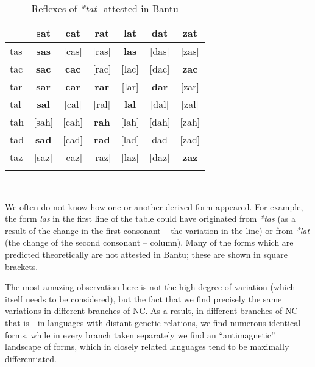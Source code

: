 \begin{table}
\caption{\label{tab:4:8}Reflexes of \textit{*tat-} attested in Bantu}


\begin{tabularx}{.66\textwidth}{lcccccc}
\lsptoprule
& \color{lsLightWine}sat &\color{lsLightWine} cat &\color{lsLightWine} rat &\color{lsLightWine} lat & \color{lsLightWine}dat & \color{lsLightWine}zat\\
\midrule
\color{lsLightWine}tas & \textbf{sas} & \color{lsMidBlue}[cas] &\color{lsMidBlue} [ras] & \textbf{las} &\color{lsMidBlue} [das] &\color{lsMidBlue}[zas]\\
\color{lsLightWine}tac & \textbf{sac} & \textbf{cac} & \color{lsMidBlue}[rac] & \color{lsMidBlue}[lac] &\color{lsMidBlue} [dac] & \textbf{zac}\\
\color{lsLightWine}tar & \textbf{sar} & \textbf{car} & \textbf{rar} & \color{lsMidBlue}[lar] & \textbf{dar} &\color{lsMidBlue} [zar]\\
\color{lsLightWine}tal & \textbf{sal} &\color{lsMidBlue} [cal] &\color{lsMidBlue} [ral] & \textbf{lal} &\color{lsMidBlue} [dal] &\color{lsMidBlue} [zal]\\
\color{lsLightWine}tah &\color{lsMidBlue} [sah] &\color{lsMidBlue} [cah] & \textbf{rah} & \color{lsMidBlue}[lah] &\color{lsMidBlue} [dah] & \color{lsMidBlue}[zah]\\
\color{lsLightWine}tad & \textbf{sad} & \color{lsMidBlue}[cad] & \textbf{rad} &\color{lsMidBlue} [lad] & dad & \color{lsMidBlue}[zad]\\
\color{lsLightWine}taz &  \color{lsMidBlue}[saz] &\color{lsMidBlue} [caz] &\color{lsMidBlue} [raz] &\color{lsMidBlue} [laz] &\color{lsMidBlue} [daz] & \textbf{zaz}\\
\lspbottomrule
\end{tabularx}
\\
\parbox{\textwidth}{\footnotesize 
We often do not know how one or another derived form appeared. For example, the form \textit{las} in the first line of the table could have originated from \textit{*tas} (as a result of the change in the first consonant – the variation in the line) or from \textit{*lat} (the change of the second consonant – column). Many of the forms which are predicted theoretically are not attested in Bantu; these are shown in square brackets. }
\end{table}
The most amazing observation here is not the high degree of variation (which itself needs to be considered), but the fact that we find precisely the same variations in different branches of NC. As a result, in different branches of NC—that is—in languages with distant genetic relations, we find numerous identical forms, while in every branch taken separately we find an “antimagnetic” landscape of forms, which in closely related languages tend to be maximally differentiated. 

